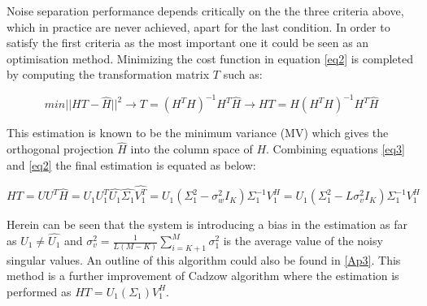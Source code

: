 Noise separation performance depends critically on the the three criteria above, which in practice are never achieved, apart for the last condition. In order to satisfy the first criteria as the most important one it could be seen as an optimisation method. Minimizing the cost function in equation \ref{eq2} is completed by computing the transformation matrix $T$ such as:

\begin{equation}\label{eq2}
min||HT-\hat{H}||^{2}\rightarrow T=(H^{T}H)^{-1}H^{T}\hat{H}\rightarrow HT=H(H^{T}H)^{-1}H^{T}\hat{H}
\end{equation}

This estimation is known to be the minimum variance (MV) \cite{11} which gives the orthogonal projection $\hat{H}$ into the column space of $H$. Combining equations \ref{eq3} and \ref{eq2} the final estimation is equated as below:

\begin{equation}\label{eq5}
HT=UU^{T}\hat{H}=U_{1}U_{1}^{T}\hat{U_{1}}\hat{\Sigma_{1}}\hat{V_{1}^{T}}=U_{1}(\Sigma^{2}_{1}-\sigma^{2}_{w}I_{K})\Sigma_{1}^{-1}V_{1}^{H}=U_{1}(\Sigma^{2}_{1}-L\sigma^{2}_{v}I_{K})\Sigma_{1}^{-1}V_{1}^{H}
\end{equation}

Herein can be seen that the system is introducing a bias in the estimation as far as $U_{1}\neq\hat{U_{1}}$ and $\sigma^{2}_{v}=\frac{1}{L(M-K)}\sum_{i=K+1}^{M}\sigma_{1}^{2}$ is the average value of the noisy singular values. An outline of this algorithm could also be found in \ref{Ap3}. This method is a further improvement of Cadzow algorithm \cite{5} where the estimation is performed as $HT=U_{1}(\Sigma_{1})V_{1}^{H}$.